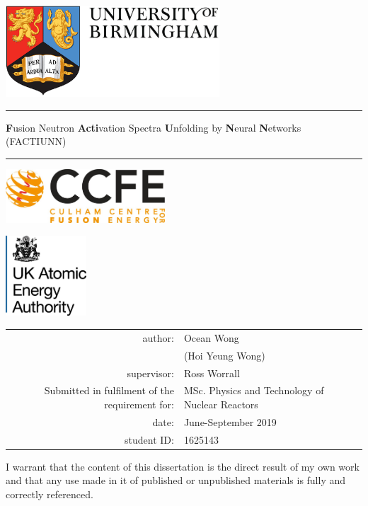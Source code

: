 \documentclass[a4paper, 12pt]{article}
\begin{document}
\centering

\includegraphics[width=8cm]{CoverPage/UoBlogo.pdf}
\hrule
\bigbreak
\textbf{F}usion Neutron \textbf{Acti}vation Spectra \textbf{U}nfolding by \textbf{N}eural \textbf{N}etworks \\
(FACTIUNN)                                      \\
\hrule
\bigbreak
\begin{minipage}[b]{0.4\textwidth}
    \includegraphics[height=2cm]{CoverPage/CCFElogo.jpeg}
  \end{minipage}
  \hfill
  \begin{minipage}[b]{0.4\textwidth}
    \includegraphics[height=3cm]{CoverPage/UKAEAlogo.jpeg}
\end{minipage}
    
\begin{table}[!h]
\centering
\begin{tabular}{rl}
author:&Ocean Wong          \\
       &(Hoi Yeung Wong)    \\
supervisor:&Ross Worrall    \\
Submitted in fulfilment of the requirement for:& MSc. Physics and Technology of Nuclear Reactors \\
date:  &June-September 2019 \\
student ID:& 1625143        \\
\end{tabular}
\end{table}

I warrant that the content of this dissertation is the direct result of my own work and that any use made in it of published or unpublished materials is fully and correctly referenced.
\end{document}
